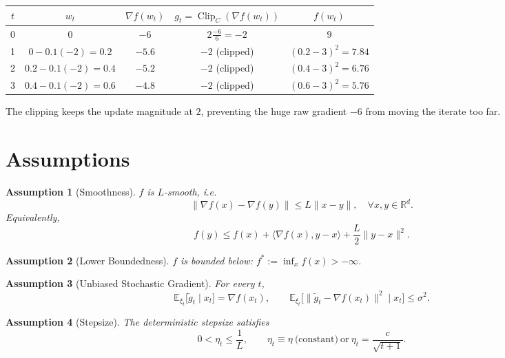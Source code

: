 \documentclass[11pt]{article}
\newtheorem{assumption}{Assumption}
\newcommand{\E}{\mathbb{E}}
\newcommand{\R}{\mathbb{R}}
\begin{document}
\begin{center}
\begin{tabular}{c|c|c|c|c}
$t$ & $w_t$ & $\nabla f(w_t)$ & $g_t=\operatorname{Clip}_C(\nabla f(w_t))$ & $f(w_t)$ \\ \hline
0 & $0$ & $-6$ & $\displaystyle 2\frac{-6}{6}= -2$ & $9$\\
1 & $0-0.1(-2)=0.2$ & $-5.6$ & $-2$ (clipped) & $(0.2-3)^2=7.84$\\
2 & $0.2-0.1(-2)=0.4$ & $-5.2$ & $-2$ (clipped) & $(0.4-3)^2=6.76$\\
3 & $0.4-0.1(-2)=0.6$ & $-4.8$ & $-2$ (clipped) & $(0.6-3)^2=5.76$
\end{tabular}
\end{center}
The clipping keeps the update magnitude at $2$, preventing the huge raw gradient $-6$ from moving the iterate too far.

\section*{Assumptions}
\begin{assumption}[Smoothness]\label{ass:smooth}
$f$ is $L$‑smooth, i.e.
\[
\|\nabla f(x)-\nabla f(y)\|\le L\|x-y\|, \quad\forall x,y\in\R^{d}.
\tag{A1}
\]
Equivalently,
\[
f(y)\le f(x)+\langle\nabla f(x),y-x\rangle+\frac{L}{2}\|y-x\|^{2}.
\tag{A1$'$}
\]
\end{assumption}

\begin{assumption}[Lower Boundedness]\label{ass:lb}
$f$ is bounded below: $f^*:=\inf_{x}f(x)>-\infty$.
\end{assumption}

\begin{assumption}[Unbiased Stochastic Gradient]\label{ass:unbiased}
For every $t$,
\[
\E_{\xi_t}\big[\tilde g_t\mid x_t\big]=\nabla f(x_t),\qquad
\E_{\xi_t}\big[\|\tilde g_t-\nabla f(x_t)\|^{2}\mid x_t\big]\le\sigma^{2}.
\tag{A3}
\]
\end{assumption}

\begin{assumption}[Stepsize]\label{ass:stepsize}
The deterministic stepsize satisfies
\[
0<\eta_t\le\frac{1}{L},\qquad \eta_t\equiv\eta\ \text{(constant)}\ \text{or}\ \eta_t=\frac{c}{\sqrt{t+1}}.
\tag{A4}
\]
\end{assumption}
\end{document}
